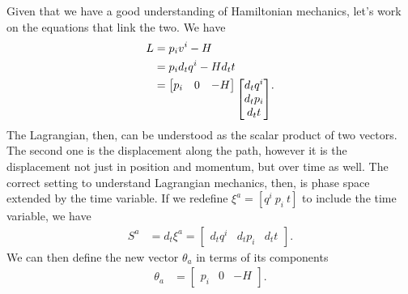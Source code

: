 Given that we have a good understanding of Hamiltonian mechanics, let's work on the equations that link the two. We have
\begin{equation}
	\begin{aligned}
		L &= p_i v^i - H \\
		&= p_i d_t q^i - H d_t t \\
		&= 
		\begin{bmatrix}
			p_i & 0 & -H
		\end{bmatrix} 
	\raisebox{-1.2em}{$
		\begin{bmatrix}
			d_t q^i \\
			d_t p_i \\
			d_t t
		\end{bmatrix}
		$}.
	\end{aligned}
\end{equation}
The Lagrangian, then, can be understood as the scalar product of two vectors. The second one is the displacement along the path, however it is the displacement not just in position and momentum, but over time as well. The correct setting to understand Lagrangian mechanics, then, is phase space extended by the time variable. If we redefine $\xi^a = [q^i \ p_i \ t]$ to include the time variable, we have
\begin{equation}
	\begin{aligned}
		S^a &= d_t \xi^a = \begin{bmatrix}
			d_t q^i & d_t p_i & d_t t
		\end{bmatrix}.
	\end{aligned}
\end{equation}
We can then define the new vector $\theta_a$ in terms of its components
\begin{equation}
	\begin{aligned}
		\theta_a &= \begin{bmatrix}
			p_i & 0 & - H
		\end{bmatrix}.
	\end{aligned}
\end{equation}

